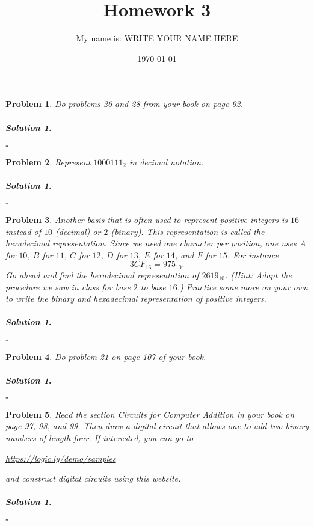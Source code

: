 \documentclass{amsart}
\theoremstyle{plain}
\newtheorem{problem}{Problem}
\newenvironment{solution}{\paragraph{\emph{Solution 1}.}}{\hfill$\square$}
\begin{document}
 

\title[Homework 3]{Homework 3}
\author{My name is:  WRITE YOUR NAME HERE}  %
\date{\today} 
\maketitle 

\begin{problem}
Do problems 26 and 28 from your book on page 92.
\end{problem}
\begin{solution}
\end{solution}

\begin{problem}
Represent $1000111_{2}$ in decimal notation.
\end{problem}
\begin{solution}
\end{solution}

\begin{problem}
Another basis that is often used to represent positive integers is $16$ instead of $10$ (decimal) or $2$ (binary).  This representation is called the hexadecimal representation.  Since we need one character per position, one uses $A$ for $10$, $B$ for $11$, $C$ for $12$, $D$ for $13$, $E$ for $14$, and $F$ for $15$.  For instance
$$3CF_{16} = 975_{10}. $$ 
Go ahead and find the hexadecimal representation of $2619_{10}$.  (Hint:  Adapt the procedure we saw in class for base $2$ to base $16$.)  Practice some more on your own to write the binary and hexadecimal representation of positive integers.
\end{problem}
\begin{solution}

\end{solution}

\begin{problem} 
Do problem 21 on page 107 of your book.
\end{problem}
\begin{solution}

\end{solution}


\begin{problem}
Read the section \emph{Circuits for Computer Addition} in your book on page 97, 98, and 99.  Then draw a digital circuit that allows one to add two binary numbers of length four.  If interested, you can go to 
\begin{center}
\url{https://logic.ly/demo/samples} 
\end{center}
and construct digital circuits using this website.
\end{problem}
\begin{solution}
\end{solution}
\end{document}
